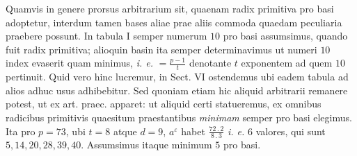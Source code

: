 Quamvis in genere prorsus arbitrarium sit, quaenam radix primitiva pro basi adoptetur, interdum tamen bases aliae prae aliis commoda quaedam peculiaria praebere possunt. In tabula I semper numerum $10$ pro basi assumsimus, quando fuit radix primitiva; alioquin basin ita semper determinavimus ut numeri $10$ index evaserit quam minimus, \emph{i. e.} $=\frac{p-1}{t}$ denotante $t$ exponentem ad quem $10$ pertinuit. Quid vero hinc lucremur, in Sect. VI ostendemus ubi eadem tabula ad alios adhuc usus adhibebitur. Sed quoniam etiam hic aliquid arbitrarii remanere potest, ut ex art. praec. apparet: ut aliquid certi statueremus, ex omnibus radicibus primitivis quaesitum praestantibus \emph{minimam} semper pro basi elegimus. Ita pro $p=73$, ubi $t=8$ atque $d=9$, $a^\varepsilon$ habet $\frac{72\,.\,2}{8\,.\,3}$ \emph{i. e.} $6$ valores, qui sunt $5,14,20,28,39,40$. Assumsimus itaque minimum $5$ pro basi.
